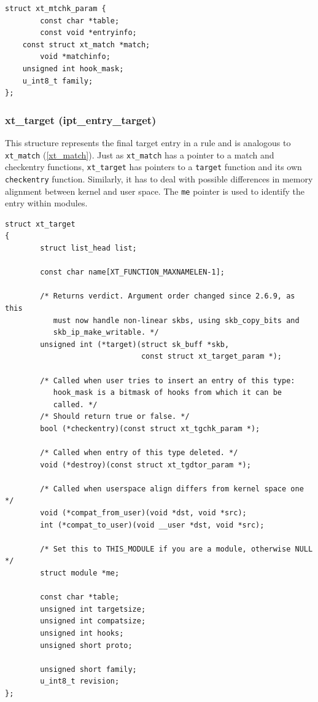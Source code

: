 \documentclass[a4paper,10pt]{article}
\newcommand{\code}[1]{\texttt{#1}}
\begin{document}
\begin{lstlisting}
struct xt_mtchk_param {
        const char *table;
        const void *entryinfo;
	const struct xt_match *match;
        void *matchinfo;
	unsigned int hook_mask;
	u_int8_t family;
};
\end{lstlisting}

\subsubsection{xt\_target (ipt\_entry\_target)}

This structure represents the final target entry in a rule and is
analogous to \code{xt\_match} (\ref{xt_match}). Just as
\code{xt\_match} has a pointer to a match and checkentry functions,
\code{xt\_target} has pointers to a \code{target} function and its own
\code{checkentry} function. Similarly, it has to deal with possible
differences in memory alignment between kernel and user space. The
\code{me} pointer is used to identify the entry within modules.

\begin{lstlisting}
struct xt_target
{
        struct list_head list;

        const char name[XT_FUNCTION_MAXNAMELEN-1];

        /* Returns verdict. Argument order changed since 2.6.9, as this                                                                                     
           must now handle non-linear skbs, using skb_copy_bits and                                                                                         
           skb_ip_make_writable. */
        unsigned int (*target)(struct sk_buff *skb,
                               const struct xt_target_param *);

        /* Called when user tries to insert an entry of this type:                                                                                          
           hook_mask is a bitmask of hooks from which it can be                                                                                             
           called. */
        /* Should return true or false. */
        bool (*checkentry)(const struct xt_tgchk_param *);

        /* Called when entry of this type deleted. */
        void (*destroy)(const struct xt_tgdtor_param *);

        /* Called when userspace align differs from kernel space one */
        void (*compat_from_user)(void *dst, void *src);
        int (*compat_to_user)(void __user *dst, void *src);

        /* Set this to THIS_MODULE if you are a module, otherwise NULL */
        struct module *me;

        const char *table;
        unsigned int targetsize;
        unsigned int compatsize;
        unsigned int hooks;
        unsigned short proto;

        unsigned short family;
        u_int8_t revision;
};
\end{lstlisting}
\end{document}

